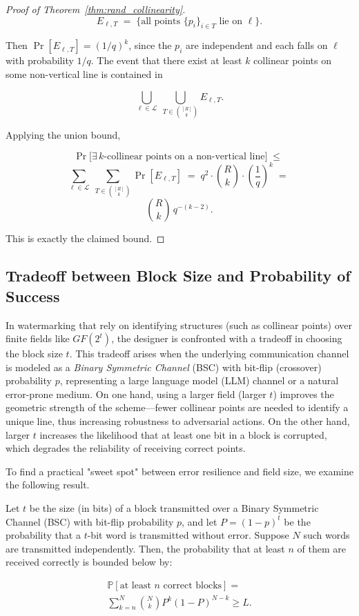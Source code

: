 \documentclass[a4paper,11pt]{llncs}
\newcommand{\cL}{\mathcal{L}}
\begin{document}
\begin{proof}[Proof of Theorem~\ref{thm:rand_collinearity}]
\[
    E_{\ell,T}\;=\;\{\text{all points } \{p_i\}_{i\in T} \text{ lie on } \ell\}.
\]

Then $\Pr[E_{\ell,T}] = (1/q)^k$, since the $p_i$ are independent and each falls on $\ell$ with probability $1/q$. The event that there exist at least $k$ collinear points on some non-vertical line is contained in

\[
    \bigcup_{\ell\in\cL}\;\bigcup_{T\in \binom{[R]}{k}} E_{\ell,T}.
\]

Applying the union bound,

\[
    \Pr\!\big[\exists\, k\text{-collinear points on a non-vertical line}\big]
    \;\le\;
\]
\noindent
\[
    \sum_{\ell\in\cL}\;\sum_{T\in \binom{[R]}{k}} \Pr[E_{\ell,T}]
    \;=\;
    q^2\cdot \binom{R}{k}\cdot \left(\frac{1}{q}\right)^{k}
    \;=\;
\]
\noindent
\[
    \binom{R}{k}\, q^{-(k-2)}.
\]

This is exactly the claimed bound.

\end{proof}


\subsection{Tradeoff between Block Size and Probability of Success}
\label{apdxsec:prob_of_success}

In watermarking that rely on identifying structures (such as collinear points) over finite fields like $GF(2^t)$, the designer is confronted with a tradeoff in choosing the block size $t$. This tradeoff arises when the underlying communication channel is modeled as a \emph{Binary Symmetric Channel} (BSC) with bit-flip (crossover) probability $p$, representing a large language model (LLM) channel or a natural error-prone medium. On one hand, using a larger field (larger $t$) improves the geometric strength of the scheme—fewer collinear points are needed to identify a unique line, thus increasing robustness to adversarial actions. On the other hand, larger $t$ increases the likelihood that at least one bit in a block is corrupted, which degrades the reliability of receiving correct points.

To find a practical "sweet spot" between error resilience and field size, we examine the following result.

\begin{theorem}
    Let $t$ be the size (in bits) of a block transmitted over a Binary Symmetric Channel (BSC) with bit-flip probability $p$, and let $P = (1 - p)^t$ be the probability that a $t$-bit word is transmitted without error. Suppose $N$ such words are transmitted independently. Then, the probability that at least $n$ of them are received correctly is bounded below by:
    
    \begin{eqnarray*}
        \mathbb{P}[\text{at least } n \text{ correct blocks}] = \\
        \sum_{k = n}^{N} \binom{N}{k} P^k (1 - P)^{N - k} \geq L.
    \end{eqnarray*}
\end{theorem}
\end{document}
